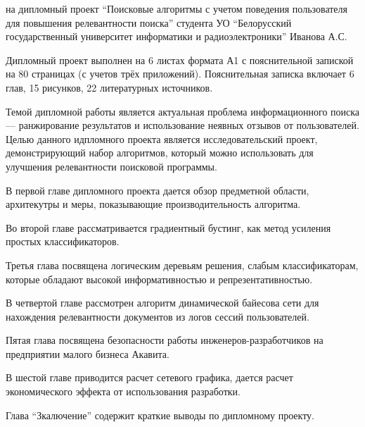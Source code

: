 \thispagestyle{empty}

\begin{center}
  \begin{minipage}{0.8\textwidth}
    на дипломный проект ``Поисковые алгоритмы с учетом поведения пользователя для повышения релевантности поиска'' студента УО ``Белорусский государственный университет информатики и радиоэлектроники'' Иванова А.С.
  \end{minipage}
\end{center}

Дипломный проект выполнен на 6 листах формата А1 с пояснительной запиской на 80 страницах (с учетов трёх приложений). Пояснительная записка включает 6 глав, 15 рисунков, 22 литературных источников.

Темой дипломной работы является актуальная проблема информационного поиска --- ранжирование результатов и использование неявных отзывов от пользователей. Целью данного идпломного проекта является исследовательский проект, демонстрирующий набор алгоритмов, который можно использовать для улучшения релевантности поисковой программы. 

В первой главе дипломного проекта дается обзор предметной области, архитекутры и меры, показывающие производительность алгоритма.

Во второй главе рассматривается градиентный бустинг, как метод усиления простых классификаторов.

Третья глава посвящена логическим деревьям решения, слабым классификаторам, которые обладают высокой информативностью и репрезентативностью.

В четвертой главе рассмотрен алгоритм динамической байесова сети для нахождения релевантности документов из логов сессий пользователей.

Пятая глава посвящена безопасности работы инженеров\hyp{}разработчиков на предприятии малого бизнеса Акавита.

В шестой главе приводится расчет сетевого графика, дается расчет экономического эффекта от использования разработки. 

Глава ``Зкалючение'' содержит краткие выводы по дипломному проекту.

\newpage
